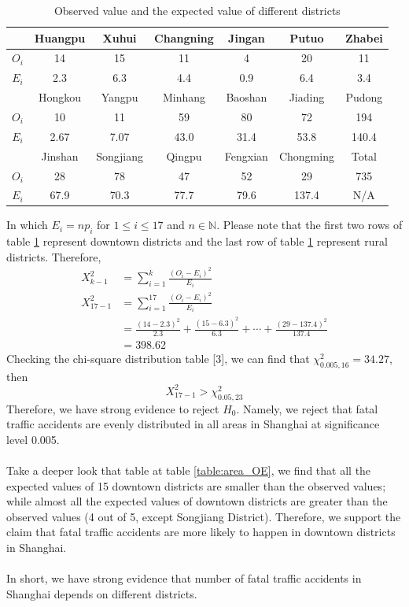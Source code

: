 \documentclass[a4paper,12pt]{article}
\begin{document}
\begin{table}[H]\centering
\begin{tabular}{|c|c|c|c|c|c|c|}
\hline
&Huangpu&Xuhui&Changning&Jingan&Putuo&Zhabei\\ \hline
$O_i$&14&15&11&4&20&11\\ \hline
$E_i$&2.3&6.3&4.4&0.9&6.4&3.4\\ \hline\hline
&Hongkou &Yangpu&Minhang&Baoshan&Jiading&Pudong\\ \hline
$O_i$&10&11&59&80&72&194\\ \hline
$E_i$&2.67&7.07&43.0&31.4&53.8&140.4\\ \hline\hline
&Jinshan &Songjiang&Qingpu&Fengxian&Chongming&Total\\ \hline
$O_i$&28&78&47&52&29&735\\ \hline
$E_i$&67.9&70.3&77.7&79.6&137.4&N/A\\ \hline
\end{tabular}
\caption{Observed value and the expected value of different districts}
\label{table:area_OEii}
\end{table}
\noindent In which $E_i=np_i$ for $1\leq i\leq 17$ and $n\in\mathbb{N}$. Please note that the first two rows of table \ref{table:area_OEii} represent downtown districts and the last row of table \ref{table:area_OEii} represent rural districts. Therefore,
\begin{equation}\label{district}
\begin{split}
X_{k-1}^{2}&=\sum_{i=1}^{k} \frac{\left(O_{i}-E_{i}\right)^{2}}{E_{i}}\\
X_{17-1}^{2}&=\sum_{i=1}^{17} \frac{\left(O_{i}-E_{i}\right)^{2}}{E_{i}}\\
&=\frac{(14-2.3)^{2}}{2.3}+\frac{(15-6.3)^{2}}{6.3}
+\cdots+\frac{(29-137.4)^{2}}{137.4}
\\&=398.62
\end{split}
\end{equation}
Checking the chi-square distribution table [3], we can find that $\chi_{0.005,16}^{2}=34.27$, then
$$X_{17-1}^{2}>\chi_{0.05,23}^{2}$$
Therefore, we have strong evidence to reject $H_0$. Namely, we reject that fatal traffic accidents are evenly distributed in all areas in Shanghai at significance level 0.005.
\\\\Take a deeper look that table at table \ref{table:area_OE}, we find that all the expected values of 15 downtown districts are smaller than the observed values; while almost all the expected values of downtown districts are greater than the observed values  (4 out of 5, except Songjiang District). Therefore, we support the claim that fatal traffic accidents are more likely to happen in downtown districts in Shanghai.\\\\
In short, we have strong evidence that number of fatal traffic accidents in Shanghai depends on different districts.
\end{document}
